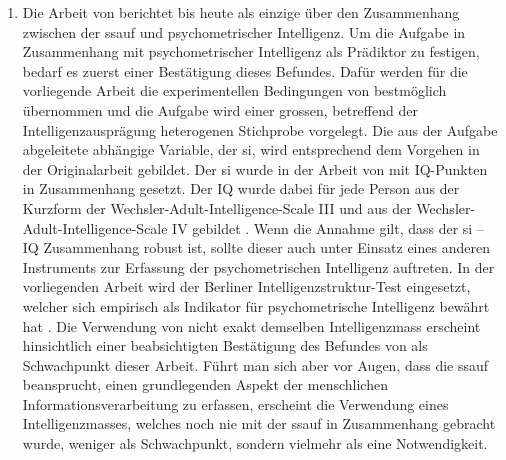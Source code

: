 \documentclass[11pt, twoside, a4paper]{book}		%
\begin{document}
\begin{enumerate}
	\item Die Arbeit von \citet{Melnick2013} berichtet bis heute als einzige über den Zusammenhang zwischen der \gls{ssauf} und psychometrischer Intelligenz. Um die Aufgabe in Zusammenhang mit psychometrischer Intelligenz als Prädiktor zu festigen, bedarf es zuerst einer Bestätigung dieses Befundes. Dafür werden für die vorliegende Arbeit die experimentellen Bedingungen von \citeauthor{Melnick2013} bestmöglich übernommen und die Aufgabe wird einer grossen, betreffend der Intelligenzausprägung heterogenen Stichprobe vorgelegt. Die aus der Aufgabe abgeleitete abhängige Variable, der \gls{si}, wird entsprechend dem Vorgehen in der Originalarbeit gebildet. Der \gls{si} wurde in der Arbeit von \citeauthor{Melnick2013} mit IQ-Punkten in Zusammenhang gesetzt. Der IQ wurde dabei für jede Person aus der Kurzform der Wechsler-Adult-Intelligence-Scale III \citep{Axelrod2002} und aus der Wechsler-Adult-In\-tell\-igence-Scale IV \citep{Wechsler2008} gebildet \citep[siehe Studie 1 und 2 bei][]{Melnick2013}. Wenn die Annahme gilt, dass der \gls{si} -- IQ Zusammenhang robust ist, sollte dieser auch unter Einsatz eines anderen Instruments zur Erfassung der psychometrischen Intelligenz auftreten. In der  vorliegenden Arbeit wird der Berliner Intelligenzstruktur-Test \citep{Jaeger1997} eingesetzt, welcher sich empirisch als Indikator für psychometrische Intelligenz bewährt hat \citep{Beauducel2002, Valerius2014}. Die Verwendung von nicht exakt demselben Intelligenzmass erscheint hinsichtlich einer beabsichtigten Bestätigung des Befundes von \citeauthor{Melnick2013} als Schwachpunkt dieser Arbeit. Führt man sich aber vor Augen, dass die \gls{ssauf} beansprucht, einen grundlegenden Aspekt der menschlichen Informationsverarbeitung zu erfassen, erscheint die Verwendung eines Intelligenzmasses, welches noch nie mit der \gls{ssauf} in Zusammenhang gebracht wurde, weniger als Schwachpunkt, sondern vielmehr als eine Notwendigkeit.


\end{enumerate}
\end{document}
